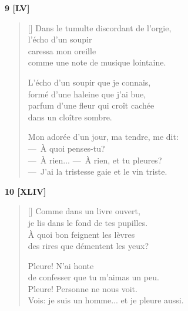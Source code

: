 \documentclass[a4paper,12pt]{book}
\begin{document}
\bigskip

\begin{center}
  \textbf{9 [LV]}
\end{center}

\settowidth{\versewidth}{---~À rien... --~À rien, et tu pleures? --~J'ai la tristesse}

\begin{verse}[\versewidth]
  Dans le tumulte discordant de l'orgie, \\
  l'écho d'un soupir \\
  caressa mon oreille \\
  comme une note de musique lointaine.

  L'écho d'un soupir que je connais, \\
  formé d'une haleine que j'ai bue, \\
  parfum d'une fleur qui croît cachée \\
  dans un cloître sombre.

  Mon adorée d'un jour, ma tendre, me dit: \\
  ---~À quoi penses-tu? \\
  ---~À rien... ---~À rien, et tu pleures? \\
  ---~J'ai la tristesse gaie et le vin triste.
\end{verse}

\bigskip

\begin{center}
  \textbf{10 [XLIV]}
\end{center}

\settowidth{\versewidth}{Vois: je suis un homme... et je pleure aussi!}

\begin{verse}[\versewidth]
  Comme dans un livre ouvert, \\
  je lis dans le fond de tes pupilles. \\
  À quoi bon feignent les lèvres \\
  des rires que démentent les yeux?

  Pleure! N'ai honte \\
  de confesser que tu m'aimas un peu. \\
  Pleure! Personne ne nous voit. \\
  Vois: je suis un homme... et je pleure aussi.
\end{verse}
\end{document}
